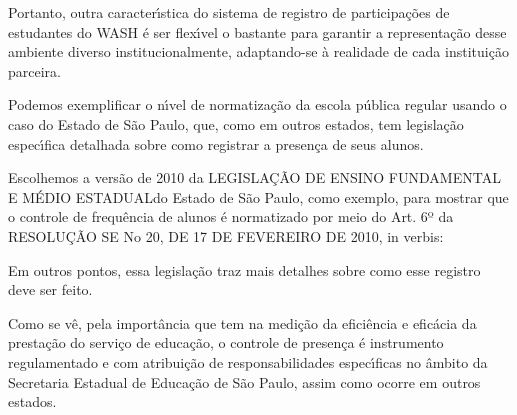 \documentclass[
12pt,		%
openright,	%
twoside,  %
a4paper,			%
chapter=TITLE,		%
english,			%
french,				%
spanish,			%
brazil				%
]{USPSC-classe/USPSC}
\begin{document}
Portanto, outra caracter\'{\i}stica do sistema de registro de participa\c{c}\~oes de estudantes do WASH \'e ser flex\'{\i}vel o bastante para garantir a representa\c{c}\~ao desse ambiente diverso institucionalmente, adaptando-se \`a realidade de cada institui\c{c}\~ao parceira.








Podemos exemplificar o n\'{\i}vel de normatiza\c{c}\~ao da escola p\'ublica regular usando o caso do Estado de S\~ao Paulo, que, como em outros estados, tem legisla\c{c}\~ao espec\'{\i}fica detalhada sobre como registrar a presen\c{c}a de seus alunos.








Escolhemos a vers\~ao de 2010 da \textquotedbl LEGISLA\c{C}\~AO DE ENSINO FUNDAMENTAL E M\'EDIO ESTADUAL\textquotedbl  do Estado de S\~ao Paulo, como exemplo, para mostrar que o controle de frequ\^encia de alunos \'e normatizado por meio do Art. 6º da RESOLU\c{C}\~AO SE No 20, DE 17 DE FEVEREIRO DE 2010, in verbis:









\noindent\begin{center}\mbox{\centering{}}\end{center}


Em outros pontos, essa legisla\c{c}\~ao traz mais detalhes sobre como esse registro deve ser feito.








Como se v\^e, pela import\^ancia que tem na medi\c{c}\~ao da efici\^encia e efic\'acia da presta\c{c}\~ao do servi\c{c}o de educa\c{c}\~ao, o controle de presen\c{c}a \'e instrumento regulamentado e com atribui\c{c}\~ao de responsabilidades espec\'{\i}ficas no \^ambito da Secretaria Estadual de Educa\c{c}\~ao de S\~ao Paulo, assim como ocorre em outros estados.
\end{document}
